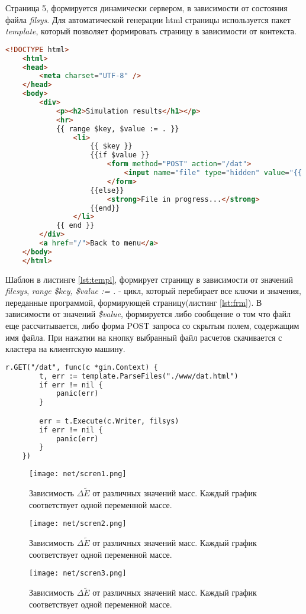 Страница 5, формируется динамически сервером, в зависимости от состояния файла \textit{filsys}. Для автоматической генерации html страницы используется 
пакет \textit{template}, который позволяет формировать страницу в зависимости от контекста.

\begin{lstlisting}[numbers=none, language=html,caption=Html шаблон, label=lst:templ]
    <!DOCTYPE html>
    <html>
    <head>
        <meta charset="UTF-8" />
    </head>
    <body>
        <div>
            <p><h2>Simulation results</h1></p>
            <hr>
            {{ range $key, $value := . }}
                <li>
                    {{ $key }}
                    {{if $value }}
                        <form method="POST" action="/dat">
                            <input name="file" type="hidden" value="{{ $key }}"><input type="submit"  value="Download">
                        </form>
                    {{else}}
                        <strong>File in progress...</strong>
                    {{end}}
                </li>
            {{ end }}
        </div>
        <a href="/">Back to menu</a>
    </body>
    </html>
\end{lstlisting}

Шаблон в листинге \ref{lst:templ}, формирует страницу в зависимости от значений \textit{filesys}, \textit{range  \$key, \$value := . } - цикл, 
который перебирает все ключи и значения, переданные программой, формирующей страницу(листинг \ref{lst:frm}). В зависимости от значений \textit{\$value}, формируется либо сообщение
о том что файл еще рассчитывается, либо форма POST запроса со скрытым полем, содержащим имя файла. При нажатии на кнопку выбранный файл расчетов скачивается
с кластера на клиентскую машину.

\begin{lstlisting}[numbers=none, language=html,caption=Формирование html, label=lst:frm]
r.GET("/dat", func(c *gin.Context) {
		t, err := template.ParseFiles("./www/dat.html")
		if err != nil {
			panic(err)
		}

		err = t.Execute(c.Writer, filsys)
		if err != nil {
			panic(err)
		}
    })
\end{lstlisting}

\newpage
\begin{figure}[h]
    \centering
    \texttt{[image: net/scren1.png]}
    \caption{Зависимость $\Delta \tilde{E}$ от различных значений масс. Каждый график соответствует одной переменной массе.}
\end{figure}

\newpage
\begin{figure}[h]
    \centering
    \texttt{[image: net/scren2.png]}
    \caption{Зависимость $\Delta \tilde{E}$ от различных значений масс. Каждый график соответствует одной переменной массе.}
\end{figure}

\newpage

\begin{figure}[h]
    \centering
    \texttt{[image: net/scren3.png]}	
    \caption{Зависимость $\Delta \tilde{E}$ от различных значений масс. Каждый график соответствует одной переменной массе.}
\end{figure}
